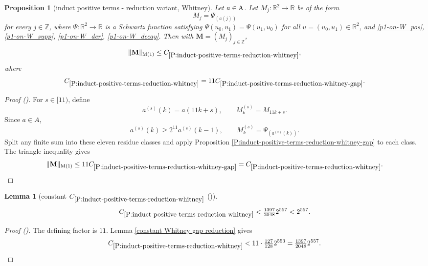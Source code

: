 \documentclass[12pt,reqno]{amsart}
\newcommand{\auto}{{({\tiny\faCar})}}
\theoremstyle{plain}
\newtheorem{lemma}[theorem]{Lemma}
\newtheorem{proposition}[theorem]{Proposition}
\numberwithin{equation}{section}
\theoremstyle{remark}
\newcommand{\uses}[1]{}
\newcommand{\usesdefs}[1]{}
\newcommand{\Z}{{\mathbb Z}}
\newcommand{\M}{\mathbf{M}}
\begin{document}
\begin{proposition}[induct positive terms - reduction variant, Whitney]
\label{P:induct-positive-terms-reduction-whitney}\uses{P:induct-positive-terms-reduction-whitney-gap}\usesdefs{bracket bump,multiplicatively spaced monotone sequences,auto:unitary-matrices-definition,kernel sequences}
Let $a\in {\rm A}$. Let $M_j:\mathbb{R}^2\to \mathbb{R}$ be of the form
\begin{equation}\label{auto:Whitney-kernel}
M_j=\Psi_{(a(j))}
\end{equation}
for every $j\in\Z$, where $\Psi:\mathbb{R}^2\to \mathbb{R}$ is a Schwartz function satisfying $\Psi(u_0,u_1)=\Psi(u_1,u_0)$ for all $u=(u_0,u_1)\in\mathbb{R}^2$, and \eqref{p1-on-W_pos}, \eqref{p1-on-W_supp}, \eqref{p1-on-W_der}, \eqref{p1-on-W_decay}. Then with $\M=(M_j)_{j\in\Z}$,
\begin{equation}\label{auto:Whitney-reduction-bound}
\|\M\|_{\rm M(1)} \le C_{\ref{P:induct-positive-terms-reduction-whitney}},
\end{equation}
where
\begin{equation}\label{auto:Whitney-constant-definition}
C_{\ref{P:induct-positive-terms-reduction-whitney}}
=11C_{\ref{P:induct-positive-terms-reduction-whitney-gap}}.
\end{equation}
\end{proposition}

\begin{proof}[Proof \auto]
For $s\in[11)$, define
\[
a^{(s)}(k)=a(11k+s),
\qquad
M^{(s)}_k=M_{11k+s}.
\]
Since $a\in A$,
\[
a^{(s)}(k)\ge2^{11}a^{(s)}(k-1),
\qquad
M^{(s)}_k=\Psi_{(a^{(s)}(k))}.
\]
Split any finite sum into these eleven residue classes and apply Proposition \ref{P:induct-positive-terms-reduction-whitney-gap} to each class. The triangle inequality gives
\[
\|\M\|_{\rm M(1)}
\le11C_{\ref{P:induct-positive-terms-reduction-whitney-gap}}
= C_{\ref{P:induct-positive-terms-reduction-whitney}}.
\]
\end{proof}

\begin{lemma}[constant $C_{\ref{P:induct-positive-terms-reduction-whitney}}$ \auto]\label{constant Whitney reduction}\uses{constant Whitney gap reduction,P:induct-positive-terms-reduction-whitney}\usesdefs{}
\begin{equation}\label{constant Whitney reduction bound}
C_{\ref{P:induct-positive-terms-reduction-whitney}}
<\tfrac{1397}{2048}2^{557}<2^{557}.
\end{equation}
\end{lemma}
\begin{proof}[Proof \auto]
The defining factor is $11$. Lemma \ref{constant Whitney gap reduction} gives
\[
C_{\ref{P:induct-positive-terms-reduction-whitney}}
<11\cdot\tfrac{127}{128}2^{553}
=\tfrac{1397}{2048}2^{557}.
\]
\end{proof}
\end{document}

